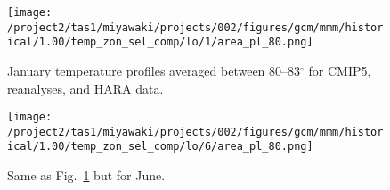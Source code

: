 \documentclass{article}
\begin{document}
\begin{figure}[t]
  \noindent\texttt{[image: /project2/tas1/miyawaki/projects/002/figures/gcm/mmm/historical/1.00/temp\_zon\_sel\_comp/lo/1/area\_pl\_80.png]}\\
  \caption{January temperature profiles averaged between 80--83$^\circ$ for CMIP5, reanalyses, and HARA data.}
  \label{fig:hara-comp-1}
\end{figure}

\begin{figure}[t]
  \noindent\texttt{[image: /project2/tas1/miyawaki/projects/002/figures/gcm/mmm/historical/1.00/temp\_zon\_sel\_comp/lo/6/area\_pl\_80.png]}\\
  \caption{Same as Fig.~\ref{fig:hara-comp-1} but for June.}
  \label{fig:hara-comp-6}
\end{figure}



\end{document}
